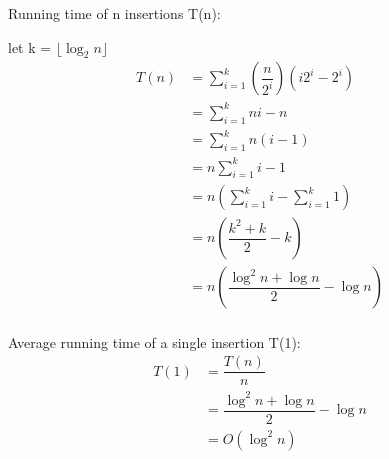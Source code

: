 \documentclass[a4paper,12pt]{article}
\begin{document}
\begin{enumerate}[a)]
  Running time of n insertions T(n):

  let k = \(\lfloor \log_2 n \rfloor\)
  \begin{align*}
    T(n)& = \sum_{i=1}^k (\dfrac{n}{2^i})(i2^i - 2^i)\\
    &= \sum_{i=1}^k ni - n\\
    &= \sum_{i=1}^k n(i - 1)\\
    &= n\sum_{i=1}^k i - 1\\
    &= n\left(\sum_{i=1}^k i - \sum_{i=1}^k 1\right)\\
    &= n\left( \dfrac{k^2 + k}{2} - k \right)\\
    &= n\left( \dfrac{\log^2 n + \log n}{2} - \log n \right)\\
  \end{align*}

  Average running time of a single insertion T(1):
  \begin{align*}
    T(1)& = \dfrac{T(n)}{n}\\
    &= \dfrac{\log^2 n + \log n}{2} - \log n\\
    &= O(\log^2 n)\\
  \end{align*}

\end{enumerate}
\end{document}
